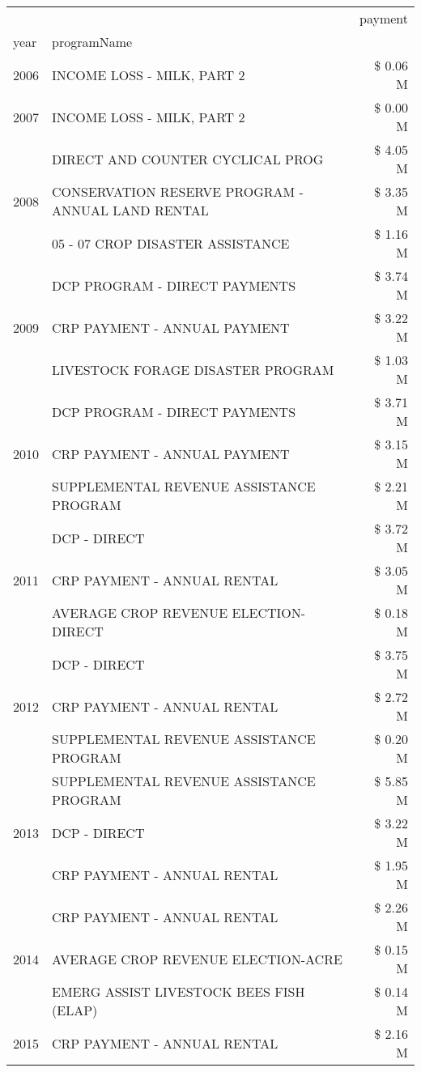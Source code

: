 \begin{tabular}{llr}
\toprule
 &  & payment \\
year & programName &  \\
\midrule
2006 & INCOME LOSS - MILK, PART 2 & \$ 0.06 M \\
\cline{1-3}
2007 & INCOME LOSS - MILK, PART 2 & \$ 0.00 M \\
\cline{1-3}
\multirow[t]{3}{*}{2008} & DIRECT AND COUNTER CYCLICAL PROG & \$ 4.05 M \\
 & CONSERVATION RESERVE PROGRAM - ANNUAL LAND RENTAL & \$ 3.35 M \\
 & 05 - 07 CROP DISASTER ASSISTANCE & \$ 1.16 M \\
\cline{1-3}
\multirow[t]{3}{*}{2009} & DCP PROGRAM - DIRECT PAYMENTS & \$ 3.74 M \\
 & CRP PAYMENT - ANNUAL PAYMENT & \$ 3.22 M \\
 & LIVESTOCK FORAGE DISASTER  PROGRAM & \$ 1.03 M \\
\cline{1-3}
\multirow[t]{3}{*}{2010} & DCP PROGRAM - DIRECT PAYMENTS & \$ 3.71 M \\
 & CRP PAYMENT - ANNUAL PAYMENT & \$ 3.15 M \\
 & SUPPLEMENTAL REVENUE ASSISTANCE PROGRAM & \$ 2.21 M \\
\cline{1-3}
\multirow[t]{3}{*}{2011} & DCP - DIRECT & \$ 3.72 M \\
 & CRP PAYMENT - ANNUAL RENTAL & \$ 3.05 M \\
 & AVERAGE CROP REVENUE ELECTION-DIRECT & \$ 0.18 M \\
\cline{1-3}
\multirow[t]{3}{*}{2012} & DCP - DIRECT & \$ 3.75 M \\
 & CRP PAYMENT - ANNUAL RENTAL & \$ 2.72 M \\
 & SUPPLEMENTAL REVENUE ASSISTANCE PROGRAM & \$ 0.20 M \\
\cline{1-3}
\multirow[t]{3}{*}{2013} & SUPPLEMENTAL REVENUE ASSISTANCE PROGRAM & \$ 5.85 M \\
 & DCP - DIRECT & \$ 3.22 M \\
 & CRP PAYMENT - ANNUAL RENTAL & \$ 1.95 M \\
\cline{1-3}
\multirow[t]{3}{*}{2014} & CRP PAYMENT - ANNUAL RENTAL & \$ 2.26 M \\
 & AVERAGE CROP REVENUE ELECTION-ACRE & \$ 0.15 M \\
 & EMERG ASSIST LIVESTOCK BEES FISH (ELAP) & \$ 0.14 M \\
\cline{1-3}
\multirow[t]{3}{*}{2015} & CRP PAYMENT - ANNUAL RENTAL & \$ 2.16 M \\

\end{tabular}
